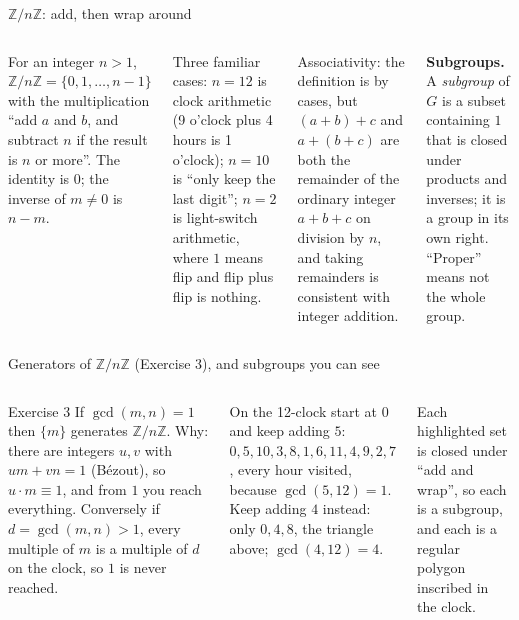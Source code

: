 \documentclass[aspectratio=169,10pt]{beamer}
\newcommand{\Z}{\mathbb{Z}}
\begin{document}
\begin{frame}{$\Z/n\Z$: add, then wrap around}
\begin{columns}[T]
\begin{defbox}
For an integer $n>1$, $\Z/n\Z=\{0,1,\dots,n-1\}$ with the multiplication ``add $a$ and $b$, and subtract $n$ if the result is $n$ or more''. The identity is $0$; the inverse of $m\neq0$ is $n-m$.
\end{defbox}
Three familiar cases: $n=12$ is clock arithmetic (9 o'clock plus 4 hours is 1 o'clock); $n=10$ is ``only keep the last digit''; $n=2$ is light-switch arithmetic, where $1$ means flip and flip plus flip is nothing.
\begin{whybox}
Associativity: the definition is by cases, but $(a+b)+c$ and $a+(b+c)$ are both the remainder of the ordinary integer $a+b+c$ on division by $n$, and taking remainders is consistent with integer addition.
\end{whybox}
\centering\scalebox{0.82}{\figclock}
\vspace{4pt}

\textbf{Subgroups.} A \emph{subgroup} of $G$ is a subset containing $1$ that is closed under products and inverses; it is a group in its own right. ``Proper'' means not the whole group.
\end{columns}
\end{frame}

\begin{frame}{Generators of $\Z/n\Z$ (Exercise 3), and subgroups you can see}
\begin{center}
\scalebox{0.72}{\figclocksub{6}{$\{0,6\}\cong\Z/2\Z$}}\hspace{2pt}
\scalebox{0.72}{\figclocksub{4}{$\{0,4,8\}\cong\Z/3\Z$}}\hspace{2pt}
\scalebox{0.72}{\figclocksub{3}{$\{0,3,6,9\}\cong\Z/4\Z$}}\hspace{2pt}
\scalebox{0.72}{\figclocksub{2}{$\{0,2,\dots,10\}\cong\Z/6\Z$}}
\end{center}
\begin{columns}[T]
\begin{exbox}{Exercise 3}
If $\gcd(m,n)=1$ then $\{m\}$ generates $\Z/n\Z$. Why: there are integers $u,v$ with $um+vn=1$ (B\'ezout), so $u\cdot m\equiv1$, and from $1$ you reach everything. Conversely if $d=\gcd(m,n)>1$, every multiple of $m$ is a multiple of $d$ on the clock, so $1$ is never reached.
\end{exbox}
\begin{trybox}
On the 12-clock start at $0$ and keep adding $5$: $0,5,10,3,8,1,6,11,4,9,2,7$, every hour visited, because $\gcd(5,12)=1$. Keep adding $4$ instead: only $0,4,8$, the triangle above; $\gcd(4,12)=4$.
\end{trybox}
Each highlighted set is closed under ``add and wrap'', so each is a subgroup, and each is a regular polygon inscribed in the clock.
\end{columns}
\end{frame}
\end{document}
